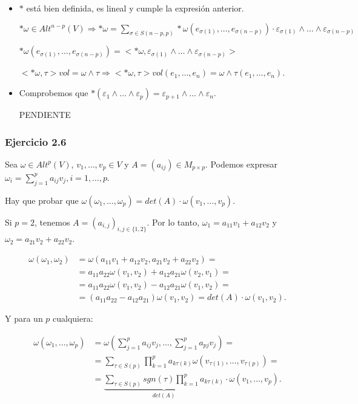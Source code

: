 \begin{itemize}
\item $*$ está bien definida, es lineal y cumple la expresión anterior.

$*\omega\in Alt^{n-p}(V) \Rightarrow *\omega = \sum_{\sigma \in S(n-p,p)}*\omega (e_{\sigma(1)},\dots,e_{\sigma(n-p)})\cdot \varepsilon_{\sigma(1)}\wedge\dots\wedge\varepsilon_{\sigma(n-p)}$

$*\omega(e_{\sigma(1)},\dots,e_{\sigma(n-p)})=<*\omega,\varepsilon_{\sigma(1)}\wedge \dots \wedge \varepsilon_{\sigma(n-p)}>$

$<*\omega,\tau>vol = \omega \wedge \tau \Rightarrow <*\omega, \tau >vol(e_1,\dots,e_n)=\omega \wedge \tau (e_1,\dots,e_n)$.

\item  Comprobemos que $*(\varepsilon_1\wedge \dots \wedge \varepsilon_p)=\varepsilon_{p+1}\wedge \dots \wedge \varepsilon_n $.

PENDIENTE
\end{itemize}


\subsubsection{Ejercicio 2.6}

Sea $\omega\in Alt^p(V) $, $v_1,\dots,v_p\in V$ y $A=(a_{ij})\in M_{p\times p} $. Podemos expresar $\omega_i=\sum_{j=1}^pa_{ij}v_j, i =1,\dots,p $. 

Hay que probar que $\omega(\omega_1,\dots,\omega_p)=det (A) \cdot \omega (v_1,\dots,v_p)$.

Si $p=2$, tenemos $A=(a_{i,j})_{i,j\in \{1,2\}}$. Por lo tanto, $\omega_1=a_{11}v_1+a_{12}v_2$ y $\omega_2=a_{21}v_2+a_{22}v_2$. 

\begin{equation}
  \begin{split}
    \omega (\omega_1,\omega_2) &= \omega(a_{11}v_1+a_{12}v_2,a_{21}v_2+a_{22}v_2) =\\
    &= a_{11}a_{22}\omega(v_1,v_2)+a_{12}a_{21}\omega(v_2,v_1) = \\
    &= a_{11}a_{22}\omega(v_1,v_2)-a_{12}a_{21}\omega(v_1,v_2) = \\
    &= (a_{11}a_{22}-a_{12}a_{21})\omega(v_1,v_2) = det (A)\cdot \omega(v_1,v_2).
  \end{split}
\end{equation}

Y para un $p$ cualquiera:

\begin{equation}
  \begin{split}
    \omega(\omega_1,\dots,\omega_p) &= \omega (\sum_{j=1}^pa_{ij}v_j,\dots,\sum_{j=1}^pa_{pj}v_j) = \\
    &= \sum_{\tau\in S(p)}\prod^p_{k=1}a_{k\tau(k)}\omega(v_{\tau(1)},\dots,v_{\tau(p)})= \\
    &= \underbrace{\sum_{ \tau\in S(p)}sgn(\tau) \prod_{k=1}^p a_{k\tau(k)}}_{det(A)} \cdot \omega(v_1,\dots,v_p).
  \end{split}
\end{equation}